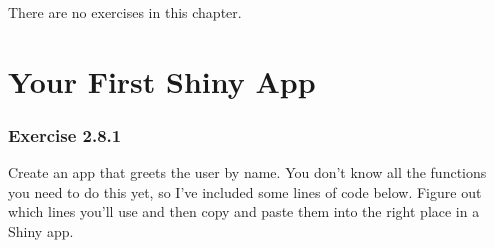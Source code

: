 \documentclass[
]{book}
\newenvironment{Shaded}{\begin{snugshade}}{\end{snugshade}}
\newcommand{\AttributeTok}[1]{\textcolor[rgb]{0.77,0.63,0.00}{#1}}
\newcommand{\DecValTok}[1]{\textcolor[rgb]{0.00,0.00,0.81}{#1}}
\newcommand{\FunctionTok}[1]{\textcolor[rgb]{0.00,0.00,0.00}{#1}}
\newcommand{\NormalTok}[1]{#1}
\newcommand{\SpecialCharTok}[1]{\textcolor[rgb]{0.00,0.00,0.00}{#1}}
\newcommand{\StringTok}[1]{\textcolor[rgb]{0.31,0.60,0.02}{#1}}
\theoremstyle{definition}
\theoremstyle{definition}
\theoremstyle{definition}
\theoremstyle{definition}
\theoremstyle{remark}
\begin{document}
There are no exercises in this chapter.

\hypertarget{your-first-shiny-app}{%
\chapter{Your First Shiny App}\label{your-first-shiny-app}}

\hypertarget{exercise-2.8.1}{%
\subsection*{Exercise 2.8.1}\label{exercise-2.8.1}}

Create an app that greets the user by name. You don't know all the functions
you need to do this yet, so I've included some lines of code below. Figure out
which lines you'll use and then copy and paste them into the right place in a
Shiny app.

\begin{Shaded}
\end{Shaded}
\end{document}
